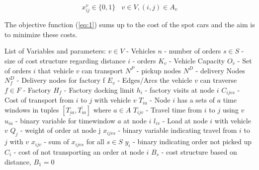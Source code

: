 \documentclass[a4paper,12pt]{article}
\begin{document}
\begin{equation} \label{eq:22}
x_{ij}^v \in \{0, 1\} ~~~~ v \in V, (i, j) \in A_v
\end{equation}




\par
The objective function (\ref{eq:1}) sums up to the cost of the spot cars and the aim is to minimize these costs. \newline \newline


List of Variables and parameters: \newline
$v \in V$ - Vehicles \newline
$n$ - number of orders\newline
$s \in S$ - size of cost structure regarding distance \newline
$i$ - orders\newline
$K_v$ - Vehicle Capacity \newline
$O_v$ - Set of orders $i$ that vehicle $v$ can transport \newline
$N^P$ - pickup nodes\newline
$N^D$ - delivery Nodes\newline
$N^D_f$ - Delivery nodes for factory f \newline
$E_v$ - Edges/Arcs the vehicle $v$ can traverse\newline
$f \in F$ - Factory\newline
$H_f$ - Factory docking limit\newline
$h_{i}$ - factory visits at node $i$  \newline
$C_{ijvs}$ - Cost of transport from $i$ to $j$ with vehicle $v$ \newline
$T_{ia}$ - Node $i$ has a sets of $a$ time windows in tuples $[ \underline{T_{ia}},  \overline{T_{ia}} ]$ where $a \in A$ \newline
$T_{ijv}$ - Travel time from $i$ to $j$ using $v$\newline
$u_{ia}$ - binary variable for timewindow $a$ at node $i$\newline 
$l_{iv}$ - Load at node $i$ with vehicle $v$ \newline
$Q_j$ - weight of order at node j \newline
$x_{ijvs}$ - binary variable indicating travel from $i$ to $j$ with $v$ \newline
$x_{ijv}$ - sum of $x_{ijvs}$ for all $s\in S$ \newline
$y_i$ - binary indicating order not picked up \newline
$C_i$ - cost of not transporting an order at node $i$ \newline
$B_s$ - cost structure based on distance, $B_1 = 0$ \newline
\end{document}
